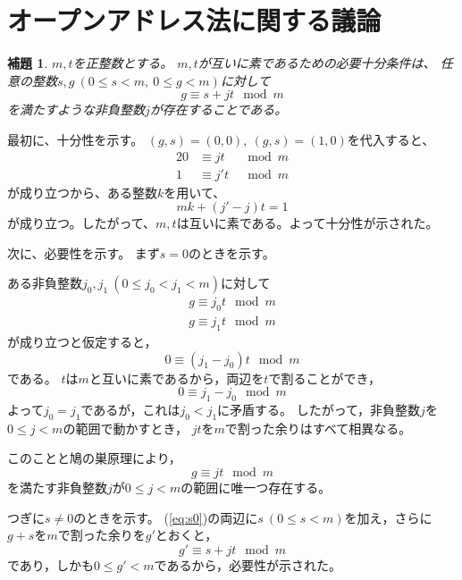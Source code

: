 \documentclass{article}
\makeatletter
\renewenvironment{proof}[1][\proofname]{\par
        \pushQED{\qed}
        \normalfont
        \topsep6\p@\@plus6\p@ \trivlist
        \item[\hskip\labelsep{\bfseries #1}\@addpunct{\bfseries}]\ignorespaces
    }{%
        \popQED\endtrivlist\@endpefalse
    }
\renewcommand{\proofname}{証明.}
\newtheorem{lemma}{補題}
\makeatother
\begin{document}
\section{オープンアドレス法に関する議論}

\begin{screen}
    \begin{lemma}
        \label{lemma:1}
        $m, t$を正整数とする。
        $m, t$が互いに素であるための必要十分条件は、
        任意の整数$s, g\ (0 \leq s < m,\ 0 \leq g < m)$に対して
        \begin{equation}
            g \equiv s + jt \mod{m}
        \end{equation}
        を満たすような非負整数$j$が存在することである。
    \end{lemma}
\end{screen}

\begin{proof}
    最初に、十分性を示す。
    $(g, s) = (0, 0),\ (g, s) = (1, 0)$を代入すると、
    \begin{alignat}{2}
        0 &\equiv j t  &\mod{m} \\
        1 &\equiv j' t &\mod{m}
    \end{alignat}
    が成り立つから、ある整数$k$を用いて、
    \begin{equation}
        mk + (j' - j)t = 1
    \end{equation}
    が成り立つ。したがって、$m, t$は互いに素である。よって十分性が示された。

    次に、必要性を示す。
    まず$s = 0$のときを示す。

    ある非負整数$j_0, j_1\ (0 \leq j_0 < j_1 < m)$に対して
    \begin{align}
        g \equiv j_0 t \mod{m} \\
        g \equiv j_1 t \mod{m}
    \end{align}
    が成り立つと仮定すると，
    \begin{equation}
        0 \equiv (j_1 - j_0) t \mod{m}
    \end{equation}
    である。
    $t$は$m$と互いに素であるから，両辺を$t$で割ることができ，
    \begin{equation}
        0 \equiv j_1 - j_0 \mod{m}
    \end{equation}
    よって$j_0 = j_1$であるが，これは$j_0 < j_1$に矛盾する。
    したがって，非負整数$j$を$0 \leq j < m$の範囲で動かすとき，
    $jt$を$m$で割った余りはすべて相異なる。

    このことと鳩の巣原理により，
    \begin{equation}
        \label{eq:s0}
        g \equiv jt \mod{m}
    \end{equation}
    を満たす非負整数$j$が$0 \leq j < m$の範囲に唯一つ存在する。

    つぎに$s \neq 0$のときを示す。
    (\ref{eq:s0})の両辺に$s\ (0 \leq s < m)$を加え，さらに$g + s$を$m$で割った余りを$g'$とおくと，
    \begin{equation}
        g' \equiv s + jt \mod{m}
    \end{equation}
    であり，しかも$0 \leq g' < m$であるから，必要性が示された。
\end{proof}

\end{document}
